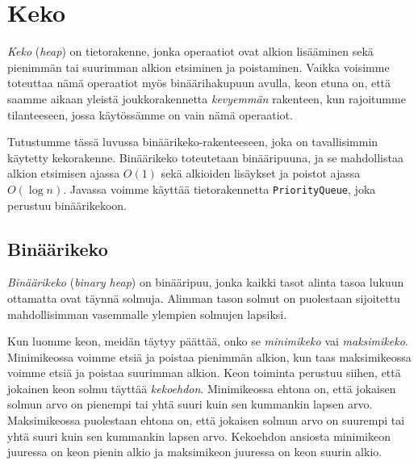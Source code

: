 \chapter{Keko}


\emph{Keko} (\emph{heap}) on tietorakenne, jonka operaatiot ovat
alkion lisääminen sekä
pienimmän tai suurimman alkion etsiminen ja poistaminen.
Vaikka voisimme toteuttaa nämä operaatiot myös
binäärihakupuun avulla, keon etuna on, että saamme aikaan
yleistä joukkorakennetta \emph{kevyemmän} rakenteen, kun
rajoitumme tilanteeseen, jossa käytössämme on vain nämä operaatiot.

Tutustumme tässä luvussa binäärikeko-rakenteeseen,
joka on tavallisimmin käytetty kekorakenne.
Binäärikeko toteutetaan binääripuuna,
ja se mahdollistaa alkion etsimisen ajassa $O(1)$ sekä
alkioiden lisäykset ja poistot ajassa $O(\log n)$.
Javassa voimme käyttää tietorakennetta \texttt{PriorityQueue},
joka perustuu binäärikekoon.

\section{Binäärikeko}


\emph{Binäärikeko} (\emph{binary heap}) on binääripuu, jonka kaikki tasot
alinta tasoa lukuun ottamatta ovat täynnä solmuja.
Alimman tason solmut on puolestaan sijoitettu
mahdollisimman vasemmalle ylempien solmujen lapsiksi.


Kun luomme keon, meidän täytyy päättää,
onko se \emph{minimikeko} vai \emph{maksimikeko}.
Minimikeossa voimme etsiä ja poistaa pienimmän alkion,
kun taas maksimikeossa voimme etsiä ja poistaa suurimman alkion.
Keon toiminta perustuu siihen, että jokainen
keon solmu täyttää \emph{kekoehdon}.
Minimikeossa ehtona on, että jokaisen solmun arvo on
pienempi tai yhtä suuri kuin sen kummankin lapsen arvo.
Maksimikeossa puolestaan ehtona on, että jokaisen solmun arvo
on suurempi tai yhtä suuri kuin sen kummankin lapsen arvo.
Kekoehdon ansiosta minimikeon juuressa on keon
pienin alkio ja maksimikeon juuressa on keon suurin alkio.

